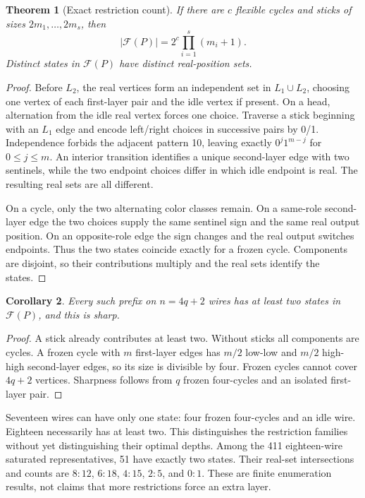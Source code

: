 \documentclass[11pt]{article}
\newtheorem{theorem}{Theorem}[section]
\newtheorem{corollary}[theorem]{Corollary}
\newcommand{\F}{\mathcal F}
\begin{document}
\begin{theorem}[Exact restriction count]\label{thm:family}
If there are $c$ flexible cycles and sticks of sizes $2m_1,\ldots,2m_s$, then
\[
 |\F(P)|=2^c\prod_{i=1}^s(m_i+1).
\]
Distinct states in $\F(P)$ have distinct real-position sets.
\end{theorem}
\begin{proof}
Before $L_2$, the real vertices form an independent set in $L_1\cup L_2$, choosing one vertex of each first-layer pair and the idle vertex if present. On a head, alternation from the idle real vertex forces one choice. Traverse a stick beginning with an $L_1$ edge and encode left/right choices in successive pairs by 0/1. Independence forbids the adjacent pattern 10, leaving exactly $0^j1^{m-j}$ for $0\le j\le m$. An interior transition identifies a unique second-layer edge with two sentinels, while the two endpoint choices differ in which idle endpoint is real. The resulting real sets are all different.

On a cycle, only the two alternating color classes remain. On a same-role second-layer edge the two choices supply the same sentinel sign and the same real output position. On an opposite-role edge the sign changes and the real output switches endpoints. Thus the two states coincide exactly for a frozen cycle. Components are disjoint, so their contributions multiply and the real sets identify the states.
\end{proof}

\begin{corollary}\label{cor:modfour}
Every such prefix on $n=4q+2$ wires has at least two states in $\F(P)$, and this is sharp.
\end{corollary}
\begin{proof}
A stick already contributes at least two. Without sticks all components are cycles. A frozen cycle with $m$ first-layer edges has $m/2$ low-low and $m/2$ high-high second-layer edges, so its size is divisible by four. Frozen cycles cannot cover $4q+2$ vertices. Sharpness follows from $q$ frozen four-cycles and an isolated first-layer pair.
\end{proof}

Seventeen wires can have only one state: four frozen four-cycles and an idle wire. Eighteen necessarily has at least two. This distinguishes the restriction families without yet distinguishing their optimal depths. Among the 411 eighteen-wire saturated representatives, 51 have exactly two states. Their real-set intersections and counts are $8:12$, $6:18$, $4:15$, $2:5$, and $0:1$. These are finite enumeration results, not claims that more restrictions force an extra layer.
\end{document}
